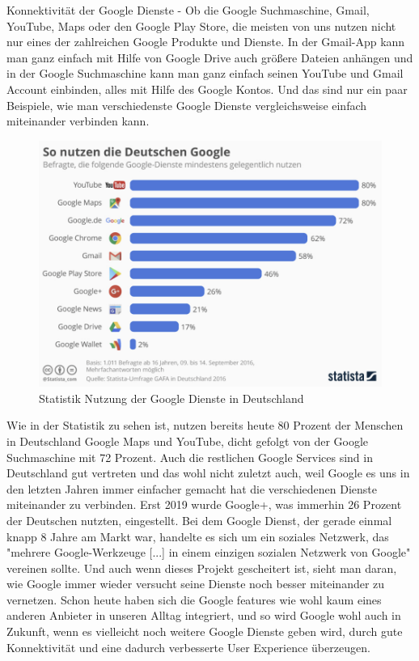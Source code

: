 \documentclass[11pt]{report}
\begin{document}
    Konnektivität der Google Dienste - Ob die Google Suchmaschine, Gmail, YouTube, Maps oder den Google Play Store, die meisten von uns nutzen nicht nur eines der zahlreichen Google Produkte und Dienste.
    In der Gmail-App kann man ganz einfach mit Hilfe von Google Drive auch größere Dateien anhängen und in der Google Suchmaschine kann man ganz einfach seinen YouTube und Gmail Account einbinden, alles mit Hilfe des Google Kontos.
    Und das sind nur ein paar Beispiele, wie man verschiedenste Google Dienste vergleichsweise einfach miteinander verbinden kann.
    \begin{figure}[h]
        \centering
        \includegraphics[width=120mm]{images/statistic_googleServices}
        \caption{Statistik Nutzung der Google Dienste in Deutschland}
        \label{fig:statisticGoogleServices}
    \end{figure}  %
    Wie in der Statistik zu sehen ist, nutzen bereits heute 80 Prozent der Menschen in Deutschland Google Maps und YouTube, dicht gefolgt von der Google Suchmaschine mit 72 Prozent.
    Auch die restlichen Google Services sind in Deutschland gut vertreten und das wohl nicht zuletzt auch, weil Google es uns in den letzten Jahren immer einfacher gemacht hat die verschiedenen Dienste miteinander zu verbinden.
    Erst 2019 wurde Google+, was immerhin 26 Prozent der Deutschen nutzten, eingestellt.
    Bei dem Google Dienst, der gerade einmal knapp 8 Jahre am Markt war, handelte es sich um ein soziales Netzwerk, das "mehrere Google-Werkzeuge [...] in einem einzigen sozialen Netzwerk von Google"\cite{[JEC21]} vereinen sollte.\cite{[JEC21]}
    Und auch wenn dieses Projekt gescheitert ist, sieht man daran, wie Google immer wieder versucht seine Dienste noch besser miteinander zu vernetzen.
    Schon heute haben sich die Google features wie wohl kaum eines anderen Anbieter in unseren Alltag integriert, und so wird Google wohl auch in Zukunft, wenn es vielleicht noch weitere Google Dienste geben wird, durch gute Konnektivität und eine dadurch verbesserte User Experience überzeugen.\\
\end{document}
